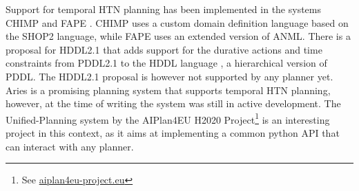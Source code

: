 Support for temporal \ac{HTN} planning has been implemented in the systems CHIMP \citep{stockHierarchicalHybridPlanning2017} and \ac{FAPE} \citep{bit-monnotFAPEConstraintbasedPlanner2020}.
CHIMP uses a custom domain definition language based on the SHOP2 language, while \ac{FAPE} uses an extended version of \ac{ANML}.
There is a proposal for HDDL2.1 \citep{pellierHDDLDefiningFormalism2023} that adds support for the durative actions and time constraints from PDDL2.1 \citep{foxPDDL2ExtensionPDDL2003} to the \ac{HDDL} language \citep{hollerHDDLExtensionPDDL2020}, a hierarchical version of \ac{PDDL}.
The HDDL2.1 proposal is however not supported by any planner yet.
Aries \citep{bit-monnotAries2024} is a promising planning system that supports temporal \ac{HTN} planning, however, at the time of writing the system was still in active development.
The Unified-Planning system \citep{frambaUnifiedPlanning2024} by the AIPlan4EU H2020 Project\footnote{See \href{https://aiplan4eu-project.eu}{aiplan4eu-project.eu}} is an interesting project in this context, as it aims at implementing a common python API that can interact with any planner.


